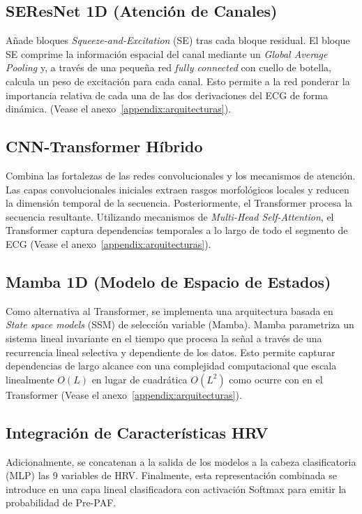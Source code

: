 \subsection{SEResNet 1D (Atención de Canales)}
Añade bloques \textit{Squeeze-and-Excitation} (SE) tras cada bloque residual.
El bloque SE comprime la información espacial del canal mediante un
\textit{Global Average Pooling} y, a través de una pequeña red \textit{fully connected}
con cuello de botella, calcula un peso de excitación para cada canal.
Esto permite a la red ponderar la importancia relativa de cada una de las dos
derivaciones del ECG de forma dinámica. \cite{senet1d}
(Vease el anexo~\ref{appendix:arquitecturas}).

\subsection{CNN-Transformer Híbrido}
Combina las fortalezas de las redes convolucionales y los mecanismos de atención.
Las capas convolucionales iniciales extraen rasgos morfológicos locales y reducen la
dimensión temporal de la secuencia. Posteriormente, el Transformer procesa
la secuencia resultante. Utilizando mecanismos de \textit{Multi-Head Self-Attention},
el Transformer captura dependencias temporales a lo largo de todo el segmento de ECG
(Vease el anexo~\ref{appendix:arquitecturas}).\cite{vaswani2023attentionneed}

\subsection{Mamba 1D (Modelo de Espacio de Estados)}
Como alternativa al Transformer, se implementa una arquitectura
basada en \textit{State space models} (SSM) de selección variable (Mamba).
Mamba parametriza un sistema lineal invariante en el tiempo que procesa la señal a través
de una recurrencia lineal selectiva y dependiente de los datos. Esto permite capturar
dependencias de largo alcance con una complejidad computacional que escala linealmente
$O(L)$ en lugar de cuadrática $O(L^2)$ como ocurre con en el Transformer
(Vease el anexo~\ref{appendix:arquitecturas}).

\subsection{Integración de Características HRV}
Adicionalmente, se concatenan a la salida de los modelos a la cabeza clasificatoria (MLP)
las 9 variables de HRV. Finalmente, esta representación combinada se introduce en una capa lineal clasificadora
con activación Softmax para emitir la probabilidad de Pre-PAF.

